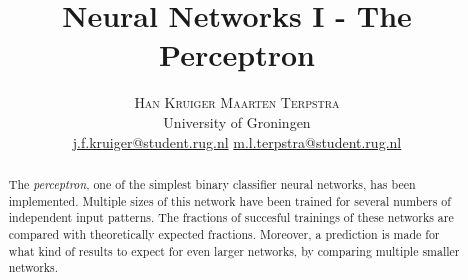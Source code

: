 \documentclass[twoside]{article}
\title{\vspace{-15mm}\fontsize{24pt}{10pt}\selectfont\textbf{Neural Networks I - The Perceptron}} %
\author{
\large
\hspace{6mm}\textsc{Han Kruiger} \hspace{12mm} \textsc{Maarten Terpstra}\\[2mm] %
\normalsize University of Groningen \\ %
\normalsize \href{mailto:j.f.kruiger@student.rug.nl}{j.f.kruiger@student.rug.nl} \hspace{5mm} \normalsize \href{mailto:m.l.terpstra@student.rug.nl}{m.l.terpstra@student.rug.nl} %
\vspace{-5mm}
}
\date{}
\begin{document}
\maketitle %

\thispagestyle{fancy} %


\begin{abstract}
\noindent The \emph{perceptron}, one of the simplest binary classifier neural networks, has been implemented.
Multiple sizes of this network have been trained for several numbers of independent input patterns.
The fractions of succesful trainings of these networks are compared with theoretically expected fractions.
Moreover, a prediction is made for what kind of results to expect for even larger networks, by comparing multiple smaller networks. 
\end{abstract}

\end{document}
